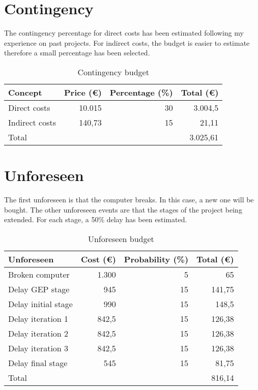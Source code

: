 \section{Contingency}
The contingency percentage for direct costs has been estimated following my experience on past projects. For indirect costs, the budget is easier to estimate therefore a small percentage has been selected.
\begin{table}[h!]
	\centering
	\begin{tabular}{|l|r|r|r|}
		\hline
		\multicolumn{1}{|l|}{Concept} & \multicolumn{1}{l|}{Price (€)} & \multicolumn{1}{l|}{Percentage (\%)} & \multicolumn{1}{l|}{Total (€)} \\ \hline
		Direct costs & 10.015 & 30 & 3.004,5 \\ \hline
		Indirect costs & 140,73 & 15 & 21,11\\ \hline\hline
		Total & \multicolumn{3}{r|}{3.025,61} \\ \hline
	\end{tabular}
	\caption{Contingency budget}
	\label{Contingency}
\end{table}

\section{Unforeseen}
The first unforeseen is that the computer breaks. In this case, a new one will be bought. The other unforeseen events are that the stages of the project being extended. For each stage, a 50\% delay has been estimated.
\begin{table}[h!]
	\centering
	\begin{tabular}{|l|r|r|r|}
		\hline
		Unforeseen & \multicolumn{1}{l|}{Cost (€)} & \multicolumn{1}{l|}{Probability (\%)} & \multicolumn{1}{l|}{Total (€)} \\ \hline
		Broken computer & 1.300 & 5 & 65 \\ \hline
		Delay GEP stage & 945 & 15 & 141,75\\ \hline
		Delay initial stage & 990 & 15 & 148,5\\ \hline
		Delay iteration 1 & 842,5 & 15 & 126,38\\ \hline
		Delay iteration 2 & 842,5 & 15 & 126,38\\ \hline
		Delay iteration 3 & 842,5 & 15 & 126,38\\ \hline
		Delay final stage & 545 & 15 & 81,75\\ \hline\hline
		Total & \multicolumn{3}{r|}{816,14} \\ \hline
	\end{tabular}
	\caption{Unforeseen budget}
	\label{Unforeseen}
\end{table}

